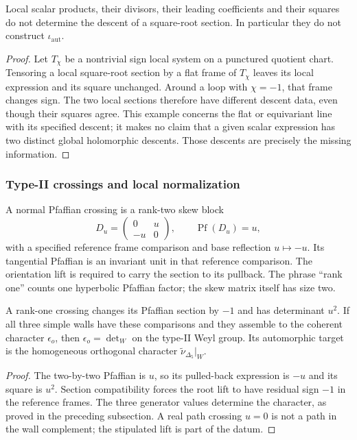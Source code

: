\begin{proposition}
\label{prop:scalar-pfaffian-data-not-section}
Local scalar products, their divisors, their leading coefficients
and their squares do not determine the descent of a square-root
section.  In particular they do not construct
\(\iota_{\mathrm{aut}}\).
\end{proposition}
\begin{proof}
Let \(T_\chi\) be a nontrivial sign local system on a punctured
quotient chart.  Tensoring a local square-root section by a flat
frame of \(T_\chi\) leaves its local expression and its square
unchanged.  Around a loop with \(\chi=-1\), that frame changes
sign.  The two local sections therefore have different descent
data, even though their squares agree.  This example concerns the
flat or equivariant line with its specified descent; it makes no
claim that a given scalar expression has two distinct global
holomorphic descents.  Those descents are precisely the missing
information.
\end{proof}

\subsubsection*{Type-II crossings and local normalization}

\begin{definition}
\label{def:rank-one-type-ii-crossing}
A normal Pfaffian crossing is a rank-two skew block
\[
 D_u=\begin{pmatrix}0&u\\-u&0\end{pmatrix},
 \qquad\operatorname{Pf}(D_u)=u,
\]
with a specified reference frame comparison and base reflection
\(u\mapsto-u\).  Its tangential Pfaffian is an invariant unit in
that reference comparison.  The orientation lift is required to carry
the section to its pullback.  The phrase ``rank one'' counts one hyperbolic
Pfaffian factor; the skew matrix itself has size two.
\end{definition}

\begin{proposition}
\label{prop:rank-one-crossing-o2-sign}
\label{prop:generic-local-sign-orientation-character}
A rank-one crossing changes its Pfaffian section by \(-1\) and
has determinant \(u^2\).  If all three simple walls have these
comparisons and they assemble to the coherent character
\(\epsilon_o\), then \(\epsilon_o=\det_W\) on the type-II Weyl
group.  Its automorphic target is the homogeneous orthogonal
character \(\widetilde\nu_{\Delta_5}|_W\).
\end{proposition}
\begin{proof}
The two-by-two Pfaffian is \(u\), so its pulled-back expression
is \(-u\) and its square is \(u^2\).  Section compatibility forces
the root lift to have residual sign \(-1\) in the reference frames.
The three generator values determine
the character, as proved in the preceding subsection.  A real path
crossing \(u=0\) is not a path in the wall complement; the stipulated
lift is part of the datum.
\end{proof}

